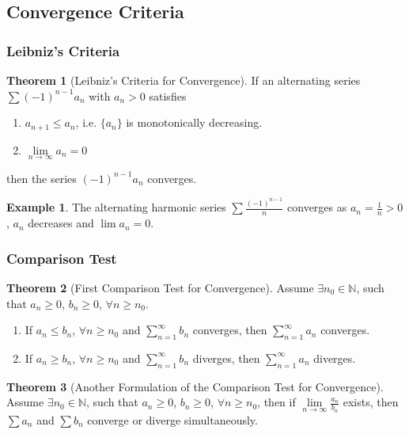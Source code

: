 \documentclass[fleqn, a4paper, 8pt, twoside]{amsart}
\theoremstyle{definition}
\newtheorem{example}{Example}
\theoremstyle{bluedefinition}
\theoremstyle{redtheorem}
\newtheorem{theorem}{Theorem}
\begin{document}
\begin{multicols}{2}
\begin{spacing}{0.7}
\subsection{Convergence Criteria}

\subsubsection{Leibniz's Criteria}

\begin{theorem}[Leibniz's Criteria for Convergence]
	If an alternating series $\sum (-1)^{n - 1} a_n$ with $a_n > 0$ satisfies
	\begin{enumerate}
		\item $a_{n + 1} \le a_n$, i.e. $\{a_n\}$ is monotonically decreasing.
		\item $\lim\limits_{n \to \infty} a_n = 0$
	\end{enumerate}
	then the series $(-1)^{n - 1} a_n$ converges.
	\label{Leibniz's Criteria for Convergence}
\end{theorem}

\begin{example}
	The alternating harmonic series $\sum \frac{(-1)^{n - 1}}{n}$ converges as $a_n = \frac{1}{n} > 0$, $a_n$ decreases and $\lim a_n = 0$.
\end{example}

\subsubsection{Comparison Test}

\begin{theorem}[First Comparison Test for Convergence]
	Assume $\exists n_0 \in \mathbb{N}$, such that $a_n \ge 0$, $b_n \ge 0$, $\forall n \ge n_0$.
	\begin{enumerate}
		\item If $a_n \le b_n$, $\forall n \ge n_0$ and $\sum\limits_{n = 1}^{\infty} b_n$ converges, then $\sum\limits_{n = 1}^{\infty} a_n$ converges.
		\item If $a_n \ge b_n$, $\forall n \ge n_0$ and $\sum\limits_{n = 1}^{\infty} b_n$ diverges, then $\sum\limits_{n = 1}^{\infty} a_n$ diverges.
	\end{enumerate}
\end{theorem}

\begin{theorem}[Another Formulation of the Comparison Test for Convergence]
	Assume $\exists n_0 \in \mathbb{N}$, such that $a_n \ge 0$, $b_n \ge 0$, $\forall n \ge n_0$, then if $\lim\limits_{n \to \infty} \frac{a_n}{b_n}$ exists, then $\sum a_n$ and $\sum b_n$ converge or diverge simultaneously.
\end{theorem}


\end{spacing}
\end{multicols}
\end{document}
